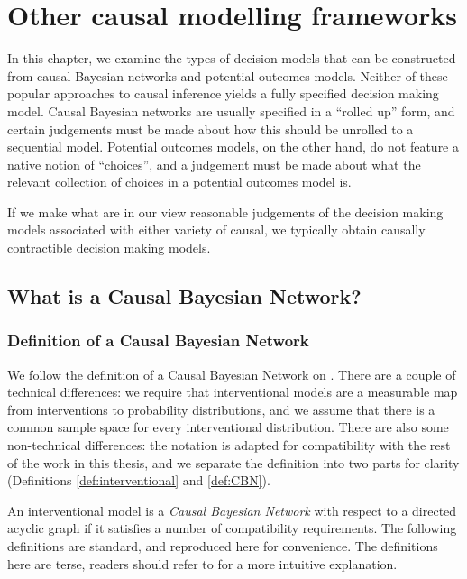 
\chapter{Other causal modelling frameworks}\label{ch:other_causal_frameworks}

In this chapter, we examine the types of decision models that can be constructed from causal Bayesian networks and potential outcomes models. Neither of these popular approaches to causal inference yields a fully specified decision making model. Causal Bayesian networks are usually specified in a ``rolled up'' form, and certain judgements must be made about how this should be unrolled to a sequential model. Potential outcomes models, on the other hand, do not feature a native notion of ``choices'', and a judgement must be made about what the relevant collection of choices in a potential outcomes model is.

If we make what are in our view reasonable judgements of the decision making models associated with either variety of causal, we typically obtain causally contractible decision making models.

\section{What is a Causal Bayesian Network?}

\subsection{Definition of a Causal Bayesian Network}

We follow the definition of a Causal Bayesian Network on \citet[page ~23-24]{pearl_causality:_2009}. There are a couple of technical differences: we require that interventional models are a measurable map from interventions to probability distributions, and we assume that there is a common sample space for every interventional distribution. There are also some non-technical differences: the notation is adapted for compatibility with the rest of the work in this thesis, and we separate the definition into two parts for clarity (Definitions \ref{def:interventional} and \ref{def:CBN}).

An interventional model is a \emph{Causal Bayesian Network} with respect to a directed acyclic graph if it satisfies a number of compatibility requirements. The following definitions are standard, and reproduced here for convenience. The definitions here are terse, readers should refer to \citet[chap. ~1]{pearl_causality:_2009} for a more intuitive explanation.


